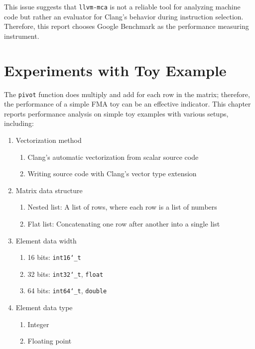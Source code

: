 \documentclass[logo,bsc,singlespacing,parskip]{infthesis}
\newcommand{\dtshort}{\texttt{int16\char`_t}}
\newcommand{\dtint}{\texttt{int32\char`_t}}
\newcommand{\dtlong}{\texttt{int64\char`_t}}
\newcommand{\dtfloat}{\texttt{float}}
\newcommand{\dtdouble}{\texttt{double}}
\newcommand{\pivot}{\texttt{pivot}}
\newcommand{\mca}{\texttt{llvm-mca}}
\newenvironment{compactlist}
{ \begin{enumerate}
    \setlength{\itemsep}{0pt}
    \setlength{\parskip}{0pt}
    \setlength{\parsep}{0pt}     
}
{ \end{enumerate} }
\begin{document}
This issue suggests that \mca{} is not a reliable tool for analyzing machine code but rather an evaluator for Clang's behavior during instruction selection. Therefore, this report chooses Google Benchmark as the performance measuring instrument.


\chapter{Experiments with Toy Example}
\label{sec:Toy}

The \pivot{} function does multiply and add for each row in the matrix; therefore, the performance of a simple FMA toy can be an effective indicator. This chapter reports performance analysis on simple toy examples with various setups, including: 

\begin{enumerate} 
    \item Vectorization method 
        \begin{compactlist} 
            \item Clang's automatic vectorization from scalar source code
            \item Writing source code with Clang's vector type extension
        \end{compactlist}
    \item Matrix data structure 
        \begin{compactlist} 
            \item Nested list: A list of rows, where each row is a list of numbers 
            \item Flat list: Concatenating one row after another into a single list
        \end{compactlist}
    \item Element data width
        \begin{compactlist} 
            \item 16 bits: \dtshort{}
            \item 32 bits: \dtint{}, \dtfloat{}
            \item 64 bits: \dtlong{}, \dtdouble{}
        \end{compactlist}
    \item Element data type 
        \begin{compactlist} 
            \item Integer
            \item Floating point
        \end{compactlist}
\end{enumerate}
\end{document}
